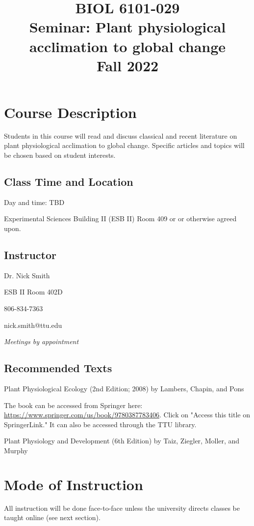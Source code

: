 \documentclass[12pt, notitlepage]{article}   	%
\title{
	\textbf{
		BIOL 6101-029
	} \\
	\large Seminar: Plant physiological acclimation to global change \\
	\large Fall 2022
}
\date{\vspace{-5ex}}
\begin{document}
{\selectfont %

\maketitle

\section{Course Description}
Students in this course will read and discuss classical and recent literature on
plant physiological acclimation to global change. Specific articles and topics
will be chosen based on student interests.

\subsection{Class Time and Location}
Day and time: TBD

Experimental Sciences Building II (ESB II) Room 409 or 
or otherwise agreed upon.

\subsection{Instructor}
Dr. Nick Smith \par
ESB II Room 402D \par
806-834-7363 \par
nick.smith@ttu.edu \par
\textit{Meetings by appointment}

\subsection{Recommended Texts}
Plant Physiological Ecology (2nd Edition; 2008) by Lambers, Chapin, and Pons \par
The book can be accessed from Springer here: 
\url{https://www.springer.com/us/book/9780387783406}. Click on "Access this title on 
SpringerLink." It can also be accessed through the TTU library. \par
Plant Physiology and Development (6th Edition) by Taiz, Ziegler, Moller, and Murphy

\section{Mode of Instruction}
All instruction will be done face-to-face unless the university directs classes be taught online (see next section).

}
\end{document}
